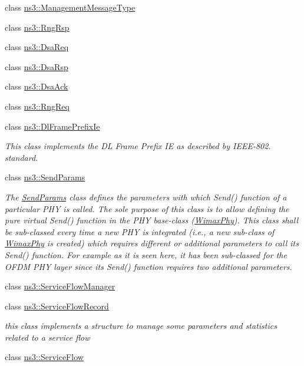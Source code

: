 \begin{DoxyCompactItemize}
class \hyperlink{classns3_1_1ManagementMessageType}{ns3\+::\+Management\+Message\+Type}
\item 
class \hyperlink{classns3_1_1RngRsp}{ns3\+::\+Rng\+Rsp}
\item 
class \hyperlink{classns3_1_1DsaReq}{ns3\+::\+Dsa\+Req}
\item 
class \hyperlink{classns3_1_1DsaRsp}{ns3\+::\+Dsa\+Rsp}
\item 
class \hyperlink{classns3_1_1DsaAck}{ns3\+::\+Dsa\+Ack}
\item 
class \hyperlink{classns3_1_1RngReq}{ns3\+::\+Rng\+Req}
\item 
class \hyperlink{classns3_1_1DlFramePrefixIe}{ns3\+::\+Dl\+Frame\+Prefix\+Ie}
\begin{DoxyCompactList}\small\item\em This class implements the DL Frame Prefix IE as described by I\+E\+E\+E-\/802. standard. \end{DoxyCompactList}\item 
class \hyperlink{classns3_1_1SendParams}{ns3\+::\+Send\+Params}
\begin{DoxyCompactList}\small\item\em The \hyperlink{classns3_1_1SendParams}{Send\+Params} class defines the parameters with which Send() function of a particular P\+HY is called. The sole purpose of this class is to allow defining the pure virtual Send() function in the P\+HY base-\/class (\hyperlink{classns3_1_1WimaxPhy}{Wimax\+Phy}). This class shall be sub-\/classed every time a new P\+HY is integrated (i.\+e., a new sub-\/class of \hyperlink{classns3_1_1WimaxPhy}{Wimax\+Phy} is created) which requires different or additional parameters to call its Send() function. For example as it is seen here, it has been sub-\/classed for the O\+F\+DM P\+HY layer since its Send() function requires two additional parameters. \end{DoxyCompactList}\item 
class \hyperlink{classns3_1_1ServiceFlowManager}{ns3\+::\+Service\+Flow\+Manager}
\item 
class \hyperlink{classns3_1_1ServiceFlowRecord}{ns3\+::\+Service\+Flow\+Record}
\begin{DoxyCompactList}\small\item\em this class implements a structure to manage some parameters and statistics related to a service flow \end{DoxyCompactList}\item 
class \hyperlink{classns3_1_1ServiceFlow}{ns3\+::\+Service\+Flow}

\end{DoxyCompactItemize}

